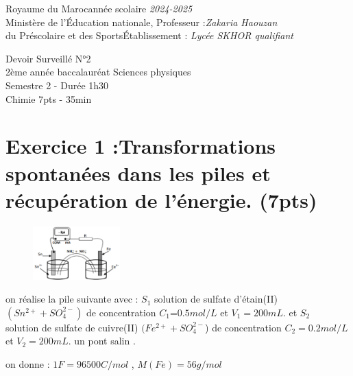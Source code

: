 \documentclass[12pt]{article}
\newcommand\headerMe[2]{\noindent{}#1\hfill#2}
\begin{document}
\headerMe{Royaume du Maroc}{année scolaire \emph{2024-2025}}\\
\headerMe{Ministère de l'Éducation nationale, }{  Professeur :\emph{Zakaria Haouzan}}\\
\headerMe{du Préscolaire et des Sports}{Établissement : \emph{Lycée SKHOR qualifiant}}\\
\vspace{-1cm}
\begin{center}
Devoir Surveillé  N°2 \\
    2ème année baccalauréat Sciences physiques\\
Semestre 2 - Durée 1h30
\\
    \vspace{.2cm}
\hrulefill
\Large{Chimie 7pts - 35min}
\hrulefill\\

\end{center}
 \section*{Exercice 1 :Transformations spontanées dans les piles et récupération de
l’énergie. \dotfill(7pts) }
\begin{figure}
	\vspace{-1.2cm}
\begin{center}
  \includegraphics[width=0.3\textwidth]{./ex_00.png}
\end{center}
\end{figure}

on réalise la pile suivante avec : $S_1$ solution de sulfate d'étain(II) \\$(Sn^{2+} + SO_4^{2-})$ de concentration $C_1$=$0.5mol/L$ et $V_1=200mL$.
et  $S_2$ \\solution de sulfate de cuivre(II) $(Fe^{2+} + SO_4^{2-}$) de concentration $C_2=0.2mol/L$ \\et $V_2=200mL$. un pont salin .

on donne : $1F=96500 C/mol$ , $M(Fe)=56g/mol$
\end{document}
